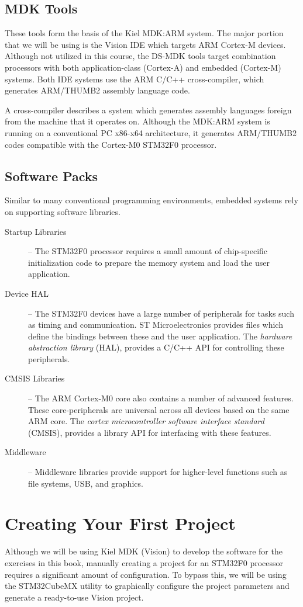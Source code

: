 \documentclass[11pt,fleqn]{book} %
\begin{document}
\subsection*{MDK Tools}
These tools form the basis of the Kiel MDK:ARM system. The major portion that we will be using is the {\textmu}Vision IDE which targets ARM Cortex-M devices. Although not utilized in this course, the DS-MDK tools target combination processors with both application-class (Cortex-A) and embedded (Cortex-M) systems. Both IDE systems use the ARM C/C++ cross-compiler, which generates ARM/THUMB2 assembly language code.

A cross-compiler describes a system which generates assembly languages foreign from the machine that it operates on. Although the MDK:ARM system is running on a conventional PC x86-x64 architecture, it generates ARM/THUMB2 codes compatible with the Cortex-M0 STM32F0 processor.

\subsection*{Software Packs}
Similar to many conventional programming environments, embedded systems rely on supporting software libraries. 

\begin{description}
	\item[Startup Libraries] -- The STM32F0 processor requires a small amount of chip-specific initialization code to prepare the memory system and load the user application.  
	\item[Device HAL] -- The STM32F0 devices have a large number of peripherals for tasks such as timing and communication. ST Microelectronics provides files which define the bindings between these and the user application. The \textit{hardware abstraction library} (HAL), provides a C/C++ API for controlling these peripherals.
	\item[CMSIS Libraries] -- The ARM Cortex-M0 core also contains a number of advanced features. These core-peripherals are universal across all devices based on the same ARM core. The \textit{cortex microcontroller software interface standard} (CMSIS), provides a library API for interfacing with these features. 
	\item[Middleware] -- Middleware libraries provide support for higher-level functions such as file systems, USB, and graphics.
\end{description}


\section{Creating Your First Project}
Although we will be using Kiel MDK ({\textmu}Vision) to develop the software for the exercises in this book, manually creating a project for an STM32F0 processor requires a significant amount of configuration. To bypass this, we will be using the STM32CubeMX utility to graphically configure the project parameters and generate a ready-to-use {\textmu}Vision project. 
\end{document}
